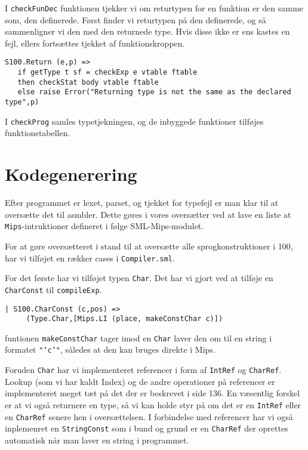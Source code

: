 \documentclass[12pt]{article}
\begin{document}
I \texttt{checkFunDec} funktionen tjekker vi om returtypen for en funktion er
den samme som, den definerede. Først finder vi returtypen på den definerede, og
så sammenligner vi den med den returnede type. Hvis disse ikke er ens kastes en
fejl, ellers fortsættes tjekket af funktionskroppen.

\begin{verbatim}
S100.Return (e,p) => 
   if getType t sf = checkExp e vtable ftable
   then checkStat body vtable ftable
   else raise Error("Returning type is not the same as the declared type",p)
\end{verbatim}

I \texttt{checkProg} samles typetjekningen, og de inbyggede funktioner tilføjes
funktionstabellen.

\section{Kodegenerering}
Efter programmet er lexet, parset, og tjekket for typefejl er man klar til at
oversætte det til asmbler. Dette gøres i vores oversætter ved at lave en liste
at \texttt{Mips}-intruktioner defineret i følge SML-Mips-modulet.

For at gøre oversætteret i stand til at oversætte alle sprogkonstruktioner i
100, har vi tilføjet en rækker cases i \texttt{Compiler.sml}.

For det første har vi tilføjet typen \texttt{Char}. Det har vi gjort ved at
tilføje en \texttt{CharConst} til \texttt{compileExp}.

\begin{verbatim}
| S100.CharConst (c,pos) =>
     (Type.Char,[Mips.LI (place, makeConstChar c)])
\end{verbatim}

funtionen \texttt{makeConstChar} tager imod en \texttt{Char} laver den om til en
string i formatet \texttt{"'c'"}, således at den kan bruges direkte i Mips.

Foruden \texttt{Char} har vi implementeret referencer i form af \texttt{IntRef}
og \texttt{CharRef}. Lookup (som vi har kaldt Index) og de andre operationer på
referencer er implementeret meget tæt på det der er beskrevet i
\cite{Mogensen11} side 136. En væsentlig forskel er at vi også returnere en
type, så vi kan holde styr på om det er en \texttt{IntRef} eller en
\texttt{CharRef} senere hen i oversættelsen. I forbindelse med referencer har vi
også inplemenret en \texttt{StringConst} som i bund og grund er en
\texttt{CharRef} der oprettes automatisk når man laver en string i programmet.
\end{document}
